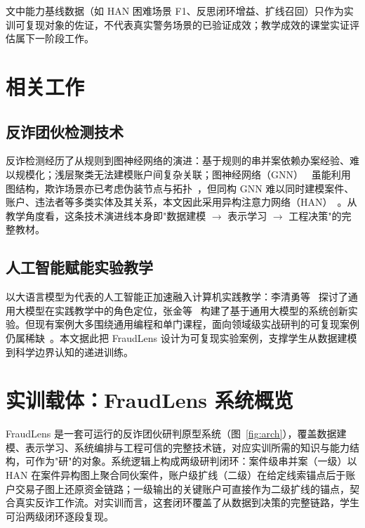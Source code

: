 \documentclass[12pt,a4paper]{ctexart}
\begin{document}
文中能力基线数据（如 HAN 困难场景 F1、反思闭环增益、扩线召回）只作为实训可复现对象的佐证，不代表真实警务场景的已验证成效；教学成效的课堂实证评估属下一阶段工作。

\section{相关工作}

\subsection{反诈团伙检测技术}

反诈检测经历了从规则到图神经网络的演进：基于规则的串并案依赖办案经验、难以规模化；浅层聚类无法建模账户间复杂关联；图神经网络（GNN）~\cite{hamilton2017graphsage} 虽能利用图结构，欺诈场景亦已考虑伪装节点与拓扑~\cite{dou2020caregnn}，但同构 GNN 难以同时建模案件、账户、违法者等多类实体及其关系，本文因此采用异构注意力网络（HAN）~\cite{wang2019han}。从教学角度看，这条技术演进线本身即"数据建模 $\to$ 表示学习 $\to$ 工程决策"的完整教材。

\subsection{人工智能赋能实验教学}

以大语言模型为代表的人工智能正加速融入计算机实践教学：李清勇等~\cite{edu_liqingyong2024} 探讨了通用大模型在实践教学中的角色定位，张金等~\cite{edu_zhangjin2024} 构建了基于通用大模型的系统创新实验。但现有案例大多围绕通用编程和单门课程，面向领域级实战研判的可复现案例仍属稀缺~\cite{edu_xiangga2022}。本文据此把 FraudLens 设计为可复现实验案例，支撑学生从数据建模到科学边界认知的递进训练。

\section{实训载体：FraudLens 系统概览}
\label{sec:arch}

FraudLens 是一套可运行的反诈团伙研判原型系统（图~\ref{fig:arch}），覆盖数据建模、表示学习、系统编排与工程可信的完整技术链，对应实训所需的知识与能力结构，可作为"研"的对象。系统逻辑上构成两级研判闭环：案件级串并案（一级）以 HAN 在案件异构图上聚合同伙案件，账户级扩线（二级）在给定线索锚点后于账户交易子图上还原资金链路；一级输出的关键账户可直接作为二级扩线的锚点，契合真实反诈工作流。对实训而言，这套闭环覆盖了从数据到决策的完整链路，学生可沿两级闭环逐段复现。
\end{document}
